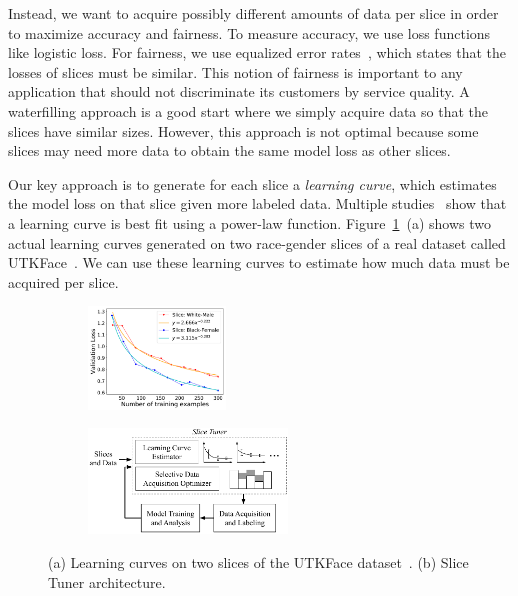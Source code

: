 \documentclass[11pt]{article}
\begin{document}
Instead, we want to acquire possibly different amounts of data per slice in order to maximize accuracy and fairness. To measure accuracy, we use loss functions like logistic loss. For fairness, we use equalized error rates~\cite{DBLP:conf/pods/Venkatasubramanian19}, which states that the losses of slices must be similar. This notion of fairness is important to any application that should not discriminate its customers by service quality. A waterfilling approach is a good start where we simply acquire data so that the slices have similar sizes. However, this approach is not optimal because some slices may need more data to obtain the same model loss as other slices.

Our key approach is to generate for each slice a {\em learning curve}, which estimates the model loss on that slice given more labeled data. Multiple studies~\cite{baidu2017deep,DBLP:conf/ijcai/DomhanSH15} show that a learning curve is best fit using a power-law function. Figure~\ref{fig:learningandtuner}~(a) shows two actual learning curves generated on two race-gender slices of a real dataset called UTKFace~\cite{zhifei2017cvpr}. We can use these learning curves to estimate how much data must be acquired per slice.


\begin{figure}[t]
\begin{subfigure}%
\centering
\includegraphics[width=0.4\textwidth]{submissions/responsible-ai/figs/lc_utkface_two.pdf}
\end{subfigure}
\hfill
\begin{subfigure}%
\centering
\includegraphics[width=0.58\textwidth]{submissions/responsible-ai/figs/slicetuner.pdf}
\end{subfigure}
  \caption{(a) Learning curves on two slices of the UTKFace dataset~\cite{zhifei2017cvpr}. (b) Slice Tuner architecture.}
  \label{fig:learningandtuner}
\end{figure}
\end{document}
